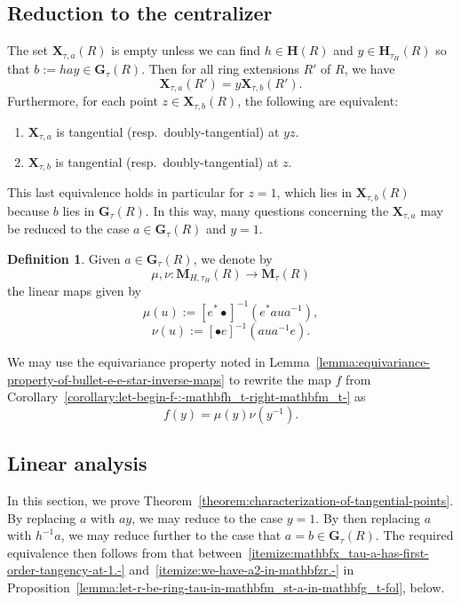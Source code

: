 \documentclass[reqno]{amsart}
\theoremstyle{plain} \newtheorem{theorem} {Theorem} \newtheorem{conjecture} {Conjecture} \newtheorem{corollary} [theorem] {Corollary} \newtheorem{proposition} [theorem] {Proposition} \newtheorem{fact} [theorem] {Fact}
\theoremstyle{definition} \newtheorem{definition} [theorem] {Definition}
\theoremstyle{itplain} %
\begin{document}
\subsection{Reduction to the centralizer}\label{sec:reduction-centralizer}
The set $\mathbf{X}_{\tau,a}(R)$ is empty unless we can find $h \in \mathbf{H}(R)$ and $y \in \mathbf{H}_{\tau_H}(R)$ so that $b := h a y \in \mathbf{G}_\tau(R)$.  Then for all ring extensions $R'$ of $R$, we have
\begin{equation*}
  \mathbf{X}_{\tau,a}(R') = y \mathbf{X}_{\tau,b}(R').
\end{equation*}
Furthermore, for each point $z\in \mathbf{X}_{\tau, b}(R)$, the following are equivalent:
\begin{enumerate}
\item $\mathbf{X}_{\tau,a}$ is tangential (resp.\ doubly-tangential) at $yz$.
\item $\mathbf{X}_{\tau,b}$ is tangential (resp.\ doubly-tangential) at $z$.
\end{enumerate}
This last equivalence holds in particular for $z = 1$, which lies in $\mathbf{X}_{\tau,b}(R)$ because $b$ lies in $\mathbf{G}_\tau(R)$.  In this way, many questions concerning the $\mathbf{X}_{\tau,a}$ may be reduced to the case $a \in \mathbf{G}_\tau(R)$ and $y = 1$.

\begin{definition}
  Given $a \in \mathbf{G}_\tau(R)$, we denote by
  \begin{equation*}
    \mu, \nu : \mathbf{M}_{H,\tau_H}(R) \rightarrow \mathbf{M}_{\tau}(R)
  \end{equation*}
  the linear maps given by
  \begin{equation*}
    \mu(u) := {[e^* \bullet]}^{-1}( e^* a u a^{-1} ),
  \end{equation*}
  \begin{equation*}
    \nu(u) :=  {[\bullet e]}^{-1}(a u a^{-1}  e).
  \end{equation*}
\end{definition}
We may use the equivariance property noted in Lemma~\ref{lemma:equivariance-property-of-bullet-e-e-star-inverse-maps} to rewrite the map $f$ from Corollary~\ref{corollary:let-begin-f-:-mathbfh_t-right-mathbfm_t-} as
\begin{equation*}
  f(y) = \mu(y) \nu(y^{-1}).
\end{equation*}


\subsection{Linear analysis}\label{sec:analysis-first-derivatives}
In this section, we prove Theorem~\ref{theorem:characterization-of-tangential-points}.  By replacing $a$ with $a y$, we may reduce to the case $y = 1$.  By then replacing $a$ with $h^{-1} a$, we may reduce further to the case that $a = b \in \mathbf{G}_\tau(R)$.  The required equivalence then follows from that between~\eqref{itemize:mathbfx_tau-a-has-first-order-tangency-at-1.-} and~\eqref{itemize:we-have-a2-in-mathbfzr.-} in Proposition~\ref{lemma:let-r-be-ring-tau-in-mathbfm_st-a-in-mathbfg_t-fol}, below.
\end{document}
